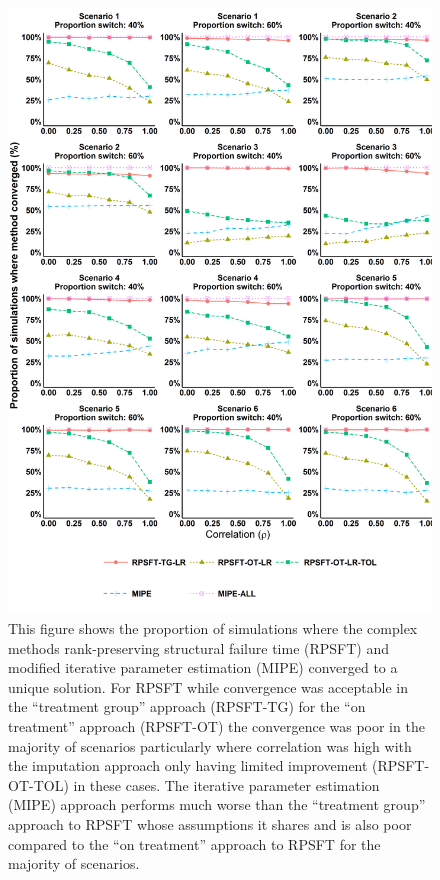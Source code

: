 \begin{figure}[ht]
\centering
\includegraphics[width=13cm]{images/chap_sim3/comp_conv.png}
\caption{\label{F:chap_sim3:conv}  This figure shows the proportion of simulations where the complex methods rank-preserving structural failure time (RPSFT) and modified iterative parameter estimation (MIPE) converged to a unique solution. For RPSFT while convergence was acceptable in the ``treatment group'' approach (RPSFT-TG) for the ``on treatment'' approach (RPSFT-OT) the convergence was poor in the majority of scenarios particularly where correlation was high with the imputation approach only having limited improvement (RPSFT-OT-TOL) in these cases. The iterative parameter estimation (MIPE) approach performs much worse than the ``treatment group'' approach to RPSFT whose assumptions it shares and is also poor compared to the ``on treatment'' approach to RPSFT for the majority of scenarios. } 
\end{figure}

